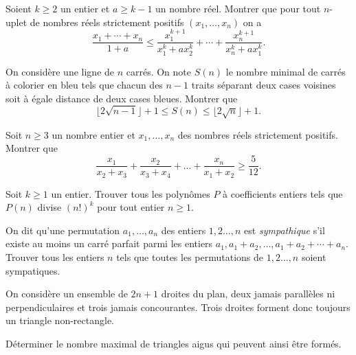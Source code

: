 \begin{exo}{}Soient $k \geq 2$ un entier et $a \geq k-1$ un nombre réel. Montrer que pour tout $n$-uplet de nombres réels strictement positifs $(x_{1}, \ldots, x_{n})$ on a
$$ \frac{x_{1}+ \cdots +x_{n}}{1+a} \leq  \frac{x_{1}^{k+1}}{x_{1}^{k}+a x_{2}^{k}}+ \cdots+ \frac{x_{n}^{k+1}}{x_{n}^{k}+a x_{1}^{k}}.$$
\end{exo}

\begin{exo}{}On considère une ligne de $n$ carrés. On note $S(n)$ le nombre minimal de carrés à colorier en bleu
tels que chacun des $n-1$ traits séparant deux cases voisines soit à égale distance de deux cases
bleues. Montrer que
$$ \lfloor 2 \sqrt {n-1} \rfloor+1 \leq S(n) \leq  \lfloor 2 \sqrt {n} \rfloor +1.$$
\end{exo}


\begin{exo}{{}}Soit $n \geq 3$ un nombre entier et $x_{1}, \ldots, x_{n}$ des nombres réels strictement positifs. Montrer que \[\frac{x_1}{x_2+x_3}+\frac{x_2}{x_3+x_4}+...+\frac{x_n}{x_1+x_2}\geq \frac{5}{12}.\]
\end{exo}

\begin{exo}{}Soit $k \geq 1$ un entier. Trouver tous les polynômes $P$ à coefficients entiers tels que $P(n)$ divise $(n!)^{k}$ pour tout entier $n \geq 1$.
\end{exo}

\begin{exo}{} On dit qu'une permutation  $a_{1}, \ldots, a_{n}$ des entiers $1,2 \ldots,n$ est \emph{sympathique} s'il existe au moins un carré parfait parmi les entiers $ a_{1}, a_{1}+a_{2}, \ldots, a_{1}+a_{2}+ \cdots+a_{n}$. Trouver tous les entiers $n$ tels que toutes les permutations de $1,2 \ldots,n$ soient sympatiques.
\end{exo}

\begin{exo}{}
On consid\`ere un ensemble de $2n+1$ droites du plan, deux jamais parall\`eles ni perpendiculaires et trois jamais concourantes. Trois droites forment donc toujours un  triangle non-rectangle.

D\'eterminer le nombre maximal de triangles aigus qui peuvent ainsi \^etre form\'es.
\end{exo}

